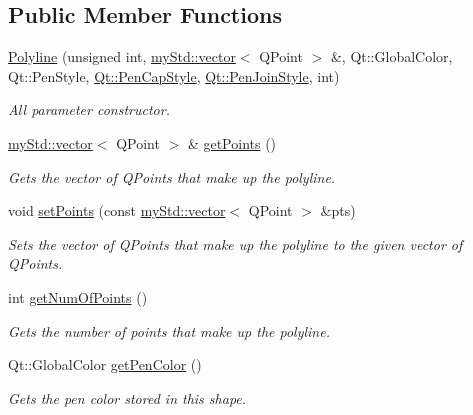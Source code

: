\subsection*{Public Member Functions}
\begin{DoxyCompactItemize}
\item 
\hyperlink{classPolyline_aaea9368c2e2bfc26ecaa36c7e125ac5e}{Polyline} (unsigned int, \hyperlink{classmyStd_1_1vector}{my\+Std\+::vector}$<$ Q\+Point $>$ \&, Qt\+::\+Global\+Color, Qt\+::\+Pen\+Style, \hyperlink{shape__input__file__specs_8txt_a622efdcfef6789d4367974d2fe79019e}{Qt\+::\+Pen\+Cap\+Style}, \hyperlink{shape__input__file__specs_8txt_a007db2043c6063881de2043c05c9c4a9}{Qt\+::\+Pen\+Join\+Style}, int)
\begin{DoxyCompactList}\small\item\em All parameter constructor. \end{DoxyCompactList}\item 
\hyperlink{classmyStd_1_1vector}{my\+Std\+::vector}$<$ Q\+Point $>$ \& \hyperlink{classPolyline_ae38a1e1f4d3a0506cac0afcee0cbf93e}{get\+Points} ()
\begin{DoxyCompactList}\small\item\em Gets the vector of Q\+Points that make up the polyline. \end{DoxyCompactList}\item 
void \hyperlink{classPolyline_a39d80ee69de06bb2037e6d73a21643b3}{set\+Points} (const \hyperlink{classmyStd_1_1vector}{my\+Std\+::vector}$<$ Q\+Point $>$ \&pts)
\begin{DoxyCompactList}\small\item\em Sets the vector of Q\+Points that make up the polyline to the given vector of Q\+Points. \end{DoxyCompactList}\item 
int \hyperlink{classPolyline_ac81ab6c46f172b381cc7b6ed4d6ec942}{get\+Num\+Of\+Points} ()
\begin{DoxyCompactList}\small\item\em Gets the number of points that make up the polyline. \end{DoxyCompactList}\item 
Qt\+::\+Global\+Color \hyperlink{classPolyline_a334e86d5b90a0f90649c64d37e95cff9}{get\+Pen\+Color} ()
\begin{DoxyCompactList}\small\item\em Gets the pen color stored in this shape. \end{DoxyCompactList}\item 

\end{DoxyCompactItemize}

